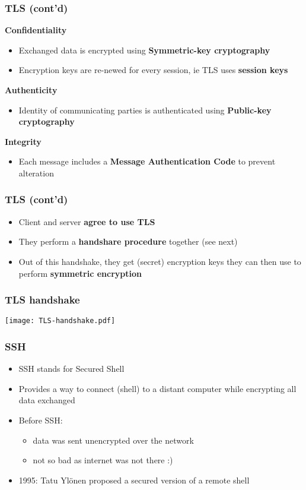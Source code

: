 \documentclass[
hyperref={pdfpagelabels=false}
,xcolor=table
]
{beamer}
\begin{document}
\begin{frame}
  \frametitle{TLS (cont'd)}

  \textbf{Confidentiality}
  \begin{itemize}
  \item Exchanged data is encrypted using \textbf{Symmetric-key cryptography}
  \item Encryption keys are re-newed for every session, ie TLS uses \textbf{session keys}
  \end{itemize}

  \textbf{Authenticity}
  \begin{itemize}
  \item Identity of communicating parties is authenticated using \textbf{Public-key cryptography}
  \end{itemize}

  \textbf{Integrity}
  \begin{itemize}
  \item Each message includes a \textbf{Message Authentication Code} to prevent alteration
  \end{itemize}
\end{frame}


\begin{frame}
  \frametitle{TLS (cont'd)}

  \begin{itemize}
  \item Client and server \textbf{agree to use TLS}
  \item They perform a \textbf{handshare procedure} together (see next)
  \item Out of this handshake, they get (secret) encryption keys they can then use to perform \textbf{symmetric encryption}
  \end{itemize}
 
\end{frame}


\begin{frame}
  \frametitle{TLS handshake}

  \begin{center}
    \texttt{[image: TLS-handshake.pdf]}
  \end{center}

\end{frame}


\begin{frame}
  \frametitle{SSH}
  \begin{itemize}
  \item SSH stands for Secured Shell
  \item Provides a way to connect (shell) to a distant computer while encrypting all data exchanged
  \item Before SSH:
    \begin{itemize}
    \item data was sent unencrypted over the network
    \item not so bad as internet was not there :) 
    \end{itemize}
  \item 1995: Tatu Ylönen proposed a secured version of a remote shell
  \end{itemize}
\end{frame}
\end{document}
